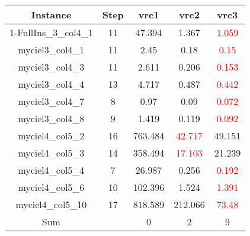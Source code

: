 \begin{tabular}{|c|c|c|c|c|} \hline
  Instance & Step & vrc1 & vrc2 & vrc3 \\ \hline
  1-FullIns\_3\_col4\_1 & 11 & 47.394 & 1.367 & \textcolor{red}{1.059} \\ \hline
  myciel3\_col4\_1 & 11 & 2.45 & 0.18 & \textcolor{red}{0.15} \\ \hline
  myciel3\_col4\_3 & 11 & 2.611 & 0.206 & \textcolor{red}{0.153} \\ \hline
  myciel3\_col4\_4 & 13 & 4.717 & 0.487 & \textcolor{red}{0.442} \\ \hline
  myciel3\_col4\_7 & 8 & 0.97 & 0.09 & \textcolor{red}{0.072} \\ \hline
  myciel3\_col4\_8 & 9 & 1.419 & 0.119 & \textcolor{red}{0.092} \\ \hline
  myciel4\_col5\_2 & 16 & 763.484 & \textcolor{red}{42.717} & 49.151 \\ \hline
  myciel4\_col5\_3 & 14 & 358.494 & \textcolor{red}{17.103} & 21.239 \\ \hline
  myciel4\_col5\_4 & 7 & 26.987 & 0.256 & \textcolor{red}{0.192} \\ \hline
  myciel4\_col5\_6 & 10 & 102.396 & 1.524 & \textcolor{red}{1.391} \\ \hline
  myciel4\_col5\_10 & 17 & 818.589 & 212.066 & \textcolor{red}{73.48} \\ \hline \hline
  Sum & & 0 & 2 & 9 \\ \hline
\end{tabular}